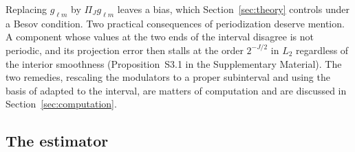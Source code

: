 \documentclass[12pt]{article} %
\theoremstyle{definition}
\theoremstyle{plain}
\newcommand{\cv}{\ell}
\newcommand{\md}{m}
\newcommand{\gcomp}[2]{g_{#1#2}}
\newcommand{\PiJ}{\Pi_{J}}
\begin{document}
Replacing $\gcomp{\cv}{\md}$ by $\PiJ\gcomp{\cv}{\md}$ leaves a bias, which
Section~\ref{sec:theory} controls under a Besov condition. Two practical
consequences of periodization deserve mention. A component whose values at the
two ends of the interval disagree is not periodic, and its projection error
then stalls at the order $2^{-J/2}$ in $L_2$ regardless of the interior
smoothness (Proposition~S3.1 in the Supplementary Material). The two remedies,
rescaling the modulators to a proper subinterval and using the basis of
\citet*{cohen1993wavelets} adapted to the interval, are matters of computation
and are discussed in Section~\ref{sec:computation}.

\subsection{The estimator}
\label{sec:estimator}
\end{document}
